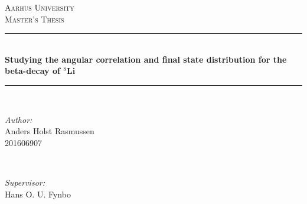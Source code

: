 \documentclass[12pt]{article}
\begin{document}
\begin{titlepage}

\newcommand{\HRule}{\rule{\linewidth}{0.5mm}} %

\center %
 

\textsc{\LARGE Aarhus University}\\[1.5cm] %
\textsc{\Large Master's Thesis}\\[0.5cm] %



\HRule \\[0.4cm]
{ \Large \bfseries Studying the angular correlation and final state distribution for the beta-decay of $^8$Li }\\[0.4cm] %
\HRule \\[1.5cm]
 

\begin{minipage}{0.4\textwidth}
\begin{flushleft} \large
\emph{Author:}\\
Anders Holst Rasmussen\\
201606907
\end{flushleft}
\end{minipage}
~
\begin{minipage}{0.4\textwidth}
\begin{flushright} \large
\emph{Supervisor:} \\
Hans O. U. Fynbo %
\end{flushright}
\end{minipage}\\[2cm]



\end{titlepage}
\end{document}
